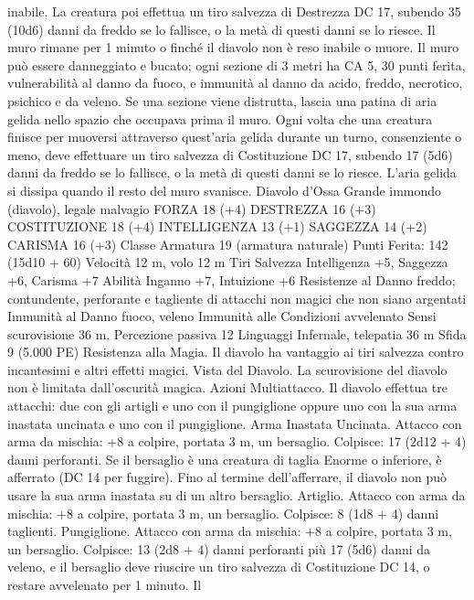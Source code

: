 \begin{multicols}{2}
inabile. La creatura poi effettua un tiro salvezza di Destrezza DC
17, subendo 35 (10d6) danni da freddo se lo fallisce, o la metà di
questi danni se lo riesce.
Il muro rimane per 1 minuto o finché il diavolo non è reso
inabile o muore. Il muro può essere danneggiato e bucato; ogni
sezione di 3 metri ha CA 5, 30 punti ferita, vulnerabilità al danno
da fuoco, e immunità al danno da acido, freddo, necrotico,
psichico e da veleno. Se una sezione viene distrutta, lascia una
patina di aria gelida nello spazio che occupava prima il muro.
Ogni volta che una creatura finisce per muoversi attraverso
quest’aria gelida durante un turno, consenziente o meno, deve
effettuare un tiro salvezza di Costituzione DC 17, subendo 17
(5d6) danni da freddo se lo fallisce, o la metà di questi danni se
lo riesce. L’aria gelida si dissipa quando il resto del muro
svanisce.
Diavolo d’Ossa
Grande immondo (diavolo), legale malvagio
FORZA 18 (+4)
DESTREZZA 16 (+3)
COSTITUZIONE 18 (+4)
INTELLIGENZA 13 (+1)
SAGGEZZA 14 (+2)
CARISMA 16 (+3)
Classe Armatura 19 (armatura naturale)
\hspace*{0pt}\hfill{Punti Ferita}: 142 (15d10 + 60)
Velocità 12 m, volo 12 m
Tiri Salvezza Intelligenza +5, Saggezza +6, Carisma +7
Abilità Inganno +7, Intuizione +6
Resistenze al Danno freddo; contundente, perforante e tagliente
di attacchi non magici che non siano argentati
Immunità al Danno fuoco, veleno
Immunità alle Condizioni avvelenato
Sensi scurovisione 36 m, Percezione passiva 12
Linguaggi Infernale, telepatia 36 m
Sfida 9 (5.000 PE)
Resistenza alla Magia. Il diavolo ha vantaggio ai tiri salvezza
contro incantesimi e altri effetti magici.
Vista del Diavolo. La scurovisione del diavolo non è limitata
dall’oscurità magica.
Azioni
Multiattacco. Il diavolo effettua tre attacchi: due con gli artigli e
uno con il pungiglione oppure uno con la sua arma inastata
uncinata e uno con il pungiglione.
Arma Inastata Uncinata. Attacco con arma da mischia: +8 a
colpire, portata 3 m, un bersaglio.
Colpisce: 17 (2d12 + 4) danni perforanti. Se il bersaglio è una
creatura di taglia Enorme o inferiore, è afferrato (DC 14 per
fuggire). Fino al termine dell’afferrare, il diavolo non può usare
la sua arma inastata su di un altro bersaglio.
Artiglio. Attacco con arma da mischia: +8 a colpire, portata 3 m,
un bersaglio.
Colpisce: 8 (1d8 + 4) danni taglienti.
Pungiglione. Attacco con arma da mischia: +8 a colpire, portata
3 m, un bersaglio.
Colpisce: 13 (2d8 + 4) danni perforanti più 17 (5d6) danni da
veleno, e il bersaglio deve riuscire un tiro salvezza di
Costituzione DC 14, o restare avvelenato per 1 minuto. Il

\end{multicols}
